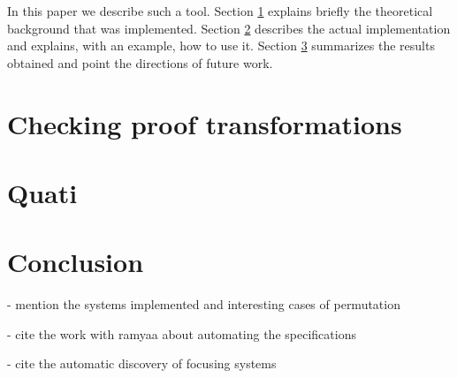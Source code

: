 \documentclass{llncs}
\begin{document}
In this paper we describe such a tool. Section \ref{sec:checking} explains
briefly the theoretical background that was implemented. Section \ref{sec:quati}
describes the actual implementation and explains, with an example, how to use
it. Section \ref{sec:conclusion} summarizes the results obtained and point the
directions of future work.

\section{Checking proof transformations}
\label{sec:checking}


\section{Quati}
\label{sec:quati}


\section{Conclusion}
\label{sec:conclusion}

- mention the systems implemented and interesting cases of permutation

- cite the work with ramyaa about automating the specifications

- cite the automatic discovery of focusing systems
\end{document}
